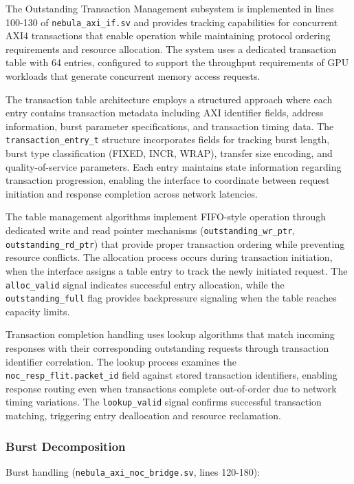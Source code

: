 \documentclass[12pt,letterpaper]{article}
\begin{document}
The Outstanding Transaction Management subsystem is implemented in lines 100-130 of \texttt{nebula\_axi\_if.sv} and provides tracking capabilities for concurrent AXI4 transactions that enable operation while maintaining protocol ordering requirements and resource allocation. The system uses a dedicated transaction table with 64 entries, configured to support the throughput requirements of GPU workloads that generate concurrent memory access requests.

The transaction table architecture employs a structured approach where each entry contains transaction metadata including AXI identifier fields, address information, burst parameter specifications, and transaction timing data. The \texttt{transaction\_entry\_t} structure incorporates fields for tracking burst length, burst type classification (FIXED, INCR, WRAP), transfer size encoding, and quality-of-service parameters. Each entry maintains state information regarding transaction progression, enabling the interface to coordinate between request initiation and response completion across network latencies.

The table management algorithms implement FIFO-style operation through dedicated write and read pointer mechanisms (\texttt{outstanding\_wr\_ptr}, \texttt{outstanding\_rd\_ptr}) that provide proper transaction ordering while preventing resource conflicts. The allocation process occurs during transaction initiation, when the interface assigns a table entry to track the newly initiated request. The \texttt{alloc\_valid} signal indicates successful entry allocation, while the \texttt{outstanding\_full} flag provides backpressure signaling when the table reaches capacity limits.

Transaction completion handling uses lookup algorithms that match incoming responses with their corresponding outstanding requests through transaction identifier correlation. The lookup process examines the \texttt{noc\_resp\_flit.packet\_id} field against stored transaction identifiers, enabling response routing even when transactions complete out-of-order due to network timing variations. The \texttt{lookup\_valid} signal confirms successful transaction matching, triggering entry deallocation and resource reclamation.

\subsubsection{Burst Decomposition}

Burst handling (\texttt{nebula\_axi\_noc\_bridge.sv}, lines 120-180):
\end{document}
